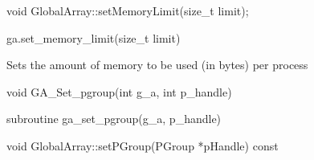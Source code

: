 \documentclass[12pt]{article}
\begin{document}
\begin{cxxapi}
\begin{cxxcode}
void GlobalArray::setMemoryLimit(size_t limit);
\end{cxxcode}
\begin{funcargs}
\end{funcargs}
\end{cxxapi}

\begin{pyapi}
\begin{pycode}
ga.set_memory_limit(size_t limit)
\end{pycode}
\begin{funcargs}
\end{funcargs}
\end{pyapi}

\local

\begin{desc}

Sets the amount of memory to be used (in bytes) per process

\end{desc}



\begin{capi}
\begin{ccode}
void GA_Set_pgroup(int g_a, int p_handle)
\end{ccode}
\begin{funcargs}
\end{funcargs}
\end{capi}

\begin{fapi}
\begin{fcode}
subroutine ga_set_pgroup(g_a, p_handle)
\end{fcode}
\begin{funcargs}
\end{funcargs}
\end{fapi}

\begin{cxxapi}
\begin{cxxcode}
void GlobalArray::setPGroup(PGroup *pHandle) const
\end{cxxcode}
\begin{funcargs}
\end{funcargs}
\end{cxxapi}
\end{document}
